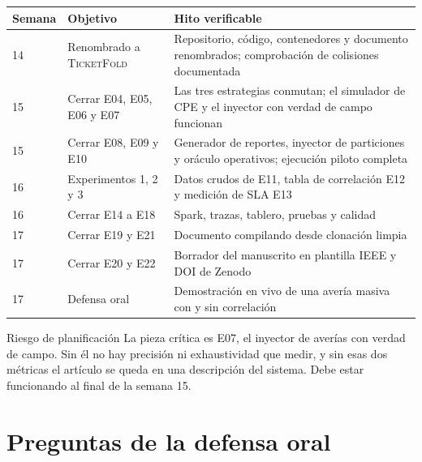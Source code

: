 \documentclass[11pt,a4paper]{article}
\begin{document}
\begin{center}
	\small
	\begin{tabular}{@{}p{1.8cm}p{6.4cm}p{6.6cm}@{}}
		\toprule
		\textbf{Semana} & \textbf{Objetivo} & \textbf{Hito verificable} \\
		\midrule
		14 & Renombrado a \textsc{TicketFold} & Repositorio, código, contenedores y documento renombrados; comprobación de colisiones documentada \\
		15 & Cerrar E04, E05, E06 y E07 & Las tres estrategias conmutan; el simulador de CPE y el inyector con verdad de campo funcionan \\
		15 & Cerrar E08, E09 y E10 & Generador de reportes, inyector de particiones y oráculo operativos; ejecución piloto completa \\
		16 & Experimentos 1, 2 y 3 & Datos crudos de E11, tabla de correlación E12 y medición de SLA E13 \\
		16 & Cerrar E14 a E18 & Spark, trazas, tablero, pruebas y calidad \\
		17 & Cerrar E19 y E21 & Documento compilando desde clonación limpia \\
		17 & Cerrar E20 y E22 & Borrador del manuscrito en plantilla IEEE y DOI de Zenodo \\
		17 & Defensa oral & Demostración en vivo de una avería masiva con y sin correlación \\
		\bottomrule
	\end{tabular}
\end{center}

\begin{alerta}{Riesgo de planificación}
	La pieza crítica es E07, el inyector de averías con verdad de campo. Sin él no hay precisión ni exhaustividad que medir, y sin esas dos métricas el artículo se queda en una descripción del sistema. Debe estar funcionando al final de la semana 15.
\end{alerta}

\section{Preguntas de la defensa oral}
\end{document}
